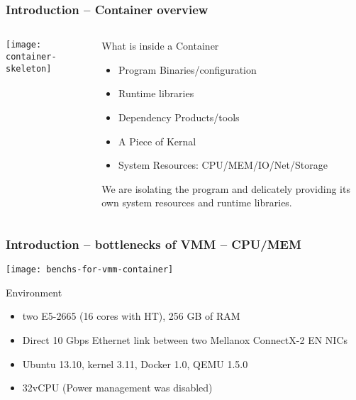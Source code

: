 \begin{frame}[plain]
	\frametitle{Introduction -- Container overview }
	
	
	\begin{columns}
		
		\begin{column}{.4\textwidth}
			\centering
			
			\texttt{[image: container-skeleton]}
		\end{column}
		
		\begin{column}{.6\textwidth}
			\Large
			What is inside a Container
			\begin{itemize}
				\item Program Binaries/configuration
				\item Runtime libraries
				\item Dependency Products/tools
				\item A Piece of Kernal
				\item System Resources: CPU/MEM/IO/Net/Storage
				
			\end{itemize}	
			We are isolating the program and delicately providing its own system resources and runtime libraries.
		\end{column}
		
	\end{columns}
	
	
\end{frame}

\begin{frame}[plain]
	\frametitle{Introduction -- bottlenecks of VMM -- CPU/MEM}
	
			\texttt{[image: benchs-for-vmm-container]}


			\large
			Environment
			\begin{itemize}
				\item two E5-2665 (16 cores with HT),  256 GB of RAM
				\item Direct 10 Gbps Ethernet link between
				two Mellanox ConnectX-2 EN NICs
				\item Ubuntu 13.10, kernel 3.11, Docker 1.0, QEMU 1.5.0
				\item 32vCPU (Power management was disabled)
			\end{itemize}	
	
\end{frame}


